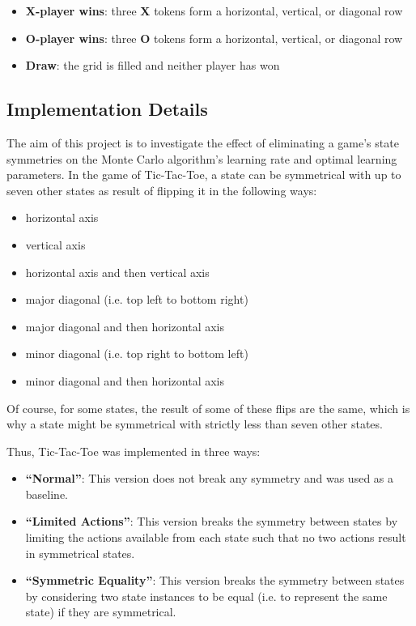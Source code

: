 \documentclass[11pt,a4paper]{report}
\begin{document}
\begin{itemize}
	\item \textbf{X-player wins}: three \textbf{X} tokens form a horizontal, vertical, or diagonal row
	\item \textbf{O-player wins}: three \textbf{O} tokens form a horizontal, vertical, or diagonal row
	\item \textbf{Draw}: the grid is filled and neither player has won
\end{itemize}


\subsection{Implementation Details}

The aim of this project is to investigate the effect of eliminating a game's state symmetries on the Monte Carlo algorithm's learning rate and optimal learning parameters. In the game of Tic-Tac-Toe, a state can be symmetrical with up to seven other states as result of flipping it in the following ways:

\begin{itemize}
	\item horizontal axis
	\item vertical axis
	\item horizontal axis and then vertical axis
	\item major diagonal (i.e. top left to bottom right)
	\item major diagonal and then horizontal axis
	\item minor diagonal (i.e. top right to bottom left)
	\item minor diagonal and then horizontal axis
\end{itemize}

Of course, for some states, the result of some of these flips are the same, which is why a state might be symmetrical with strictly less than seven other states.

Thus, Tic-Tac-Toe was implemented in three ways:

\begin{itemize}

	\item \textbf{``Normal''}:
This version does not break any symmetry and was used as a baseline.

	\item \textbf{``Limited Actions''}:
This version breaks the symmetry between states by limiting the actions available from each state such that no two actions result in symmetrical states.

	\item \textbf{``Symmetric Equality''}: 
This version breaks the symmetry between states by considering two state instances to be equal (i.e. to represent the same state) if they are symmetrical.

\end{itemize}
\end{document}
